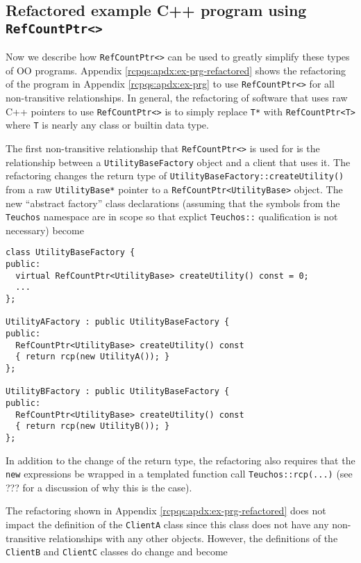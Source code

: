 \documentclass[pdf,ps2pdf,11pt]{SANDreport}
\begin{document}
%
\subsection{Refactored example C++ program using {}\texttt{Ref\-Count\-Ptr<>}}
%

Now we describe how {}\texttt{Ref\-Count\-Ptr<>} can be used to
greatly simplify these types of OO programs.  Appendix
{}\ref{rcpqs:apdx:ex-prg-refactored} shows the refactoring of the
program in Appendix {}\ref{rcpqs:apdx:ex-prg} to use
{}\texttt{Ref\-Count\-Ptr<>} for all non-transitive relationships.  In
general, the refactoring of software that uses raw C++ pointers to use
{}\texttt{Ref\-Count\-Ptr<>} is to simply replace {}\texttt{T*} with
{}\texttt{Ref\-Count\-Ptr<T>} where {}\texttt{T} is nearly any class
or builtin data type.

The first non-transitive relationship that
{}\texttt{Ref\-Count\-Ptr<>} is used for is the relationship between a
{}\texttt{Utility\-Base\-Factory} object and a client that uses it.
The refactoring changes the return type of
{}\texttt{Utility\-Base\-Factory\-::createUtility()} from a raw
{}\texttt{Utility\-Base*} pointer to a
{}\texttt{Ref\-Count\-Ptr<Utility\-Base>} object.  The new ``abstract
factory'' class declarations (assuming that the symbols from the
{}\texttt{Teuchos} namespace are in scope so that explict
{}\texttt{Teuchos::} qualification is not necessary) become

{\small\begin{verbatim}
class UtilityBaseFactory {
public:
  virtual RefCountPtr<UtilityBase> createUtility() const = 0;
  ...
};

UtilityAFactory : public UtilityBaseFactory {
public:
  RefCountPtr<UtilityBase> createUtility() const
  { return rcp(new UtilityA()); }
};

UtilityBFactory : public UtilityBaseFactory {
public:
  RefCountPtr<UtilityBase> createUtility() const
  { return rcp(new UtilityB()); }
};
\end{verbatim}}

In addition to the change of the return type, the refactoring also
requires that the {}\texttt{new} expressions be wrapped in a templated
function call {}\texttt{Teuchos\-::rcp(...)} (see ??? for a discussion
of why this is the case).

The refactoring shown in Appendix {}\ref{rcpqs:apdx:ex-prg-refactored}
does not impact the definition of the {}\texttt{ClientA} class since
this class does not have any non-transitive relationships with any
other objects.  However, the definitions of the {}\texttt{ClientB} and
{}\texttt{ClientC} classes do change and become
\end{document}
